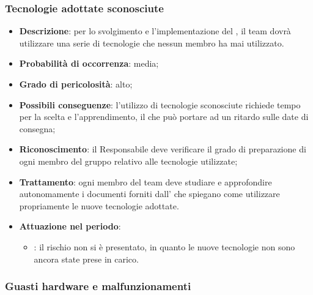 \documentclass[PianoDiProgetto.tex]{subfiles}
\begin{document}
		\subsubsection{Tecnologie adottate sconosciute}
			\label{sec:tas}
		\begin{itemize}
		\item \textbf{Descrizione}: per lo svolgimento e l'implementazione del , il team dovrà utilizzare una serie di tecnologie che nessun membro ha mai utilizzato.
		\item \textbf{Probabilità di occorrenza}: media;
		\item \textbf{Grado di pericolosità}: alto;
		\item \textbf{Possibili conseguenze}: l’utilizzo di tecnologie sconosciute richiede tempo per la scelta e l’apprendimento, il che può portare ad un ritardo sulle date di consegna;
	
		\item \textbf{Riconoscimento}: il Responsabile deve verificare il grado di preparazione di ogni membro del gruppo relativo alle tecnologie utilizzate;
		\item \textbf{Trattamento}: ogni membro del team deve studiare e approfondire autonomamente i documenti forniti dall'\AMM{} che spiegano come utilizzare propriamente le nuove tecnologie adottate.
		\item \textbf{Attuazione nel periodo}: 
			\begin{itemize}
				\item \PerAR : il rischio non si è presentato, in quanto le nuove tecnologie non sono ancora state prese in carico.
			\end{itemize}

	\end{itemize}
	
	\subsubsection{Guasti hardware e malfunzionamenti }
		\label{sec:ghs}
\end{document}
